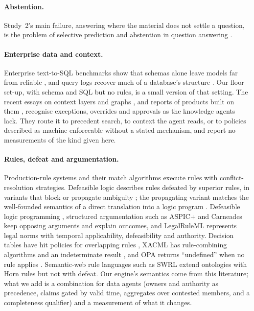 \documentclass[11pt]{article}
\begin{document}
\paragraph{Abstention.} Study~2's main failure, answering where the material does not settle a question, is the
problem of selective prediction and abstention in question answering \citep{kamath2020selective}.

\paragraph{Enterprise data and context.} Enterprise text-to-SQL benchmarks show that schemas alone leave models far
from reliable \citep{beaver2024}, and query logs recover much of a database's structure \citep{akgul2026schemafree}.
Our floor set-up, with schema and SQL but no rules, is a small version of that setting. The recent essays on
context layers and graphs \citep{gupta2025context,cui2026context,klahr2026context}, and reports of products built on
them \citep{plumb2026rippletide}, recognise exceptions, overrides and approvals as the knowledge agents lack. They
route it to precedent search, to context the agent reads, or to policies described as machine-enforceable without a
stated mechanism, and report no measurements of the kind given here.

\paragraph{Rules, defeat and argumentation.} Production-rule systems and their match algorithms
\citep{forgy1982rete} execute rules with conflict-resolution strategies. Defeasible logic describes rules defeated
by superior rules, in variants that block or propagate ambiguity \citep{antoniou2006,billington2010,maher2021}; the
propagating variant matches the well-founded semantics of a direct translation into a logic program
\citep{maier2011}. Defeasible logic programming \citep{garcia2004delp}, structured argumentation such as ASPIC+
\citep{modgil2014aspic} and Carneades \citep{gordon2007carneades} keep opposing arguments and explain outcomes, and
LegalRuleML \citep{legalruleml} represents legal norms with temporal applicability, defeasibility and authority.
Decision tables have hit policies for overlapping rules \citep{dmn}, XACML has rule-combining algorithms and an
indeterminate result \citep{xacml}, and OPA returns ``undefined'' when no rule applies \citep{opa}. Semantic-web rule
languages such as SWRL \citep{swrl} extend ontologies with Horn rules but not with defeat. Our engine's semantics
come from this literature; what we add is a combination for data agents (owners and authority as precedence,
claims gated by valid time, aggregates over contested members, and a completeness qualifier) and a measurement of
what it changes.
\end{document}
